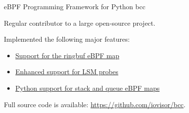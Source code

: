

\begin{cventries}

  \cventry
    {eBPF Programming Framework for Python} %
    {bcc} %
    {} %
    {} %
    {
      \begin{cvitems} %
        \item Regular contributor to a large open-source project.
        \item Implemented the following major features:
        \begin{itemize}
          \item \href{https://github.com/iovisor/bcc/commit/fe730f29f14bef8b5ffe1112c578df876c44d22d}
            {Support for the ringbuf eBPF map}
          \item \href{https://github.com/iovisor/bcc/commit/9b82af3ef53bbae76d9f09f403b58975995aa900}
            {Enhanced support for LSM probes}
          \item \href{https://github.com/iovisor/bcc/commit/e70bbdcbcbcd01e5570ba7b9d79e282d16a53d40}
            {Python support for stack and queue eBPF maps}
        \end{itemize}
        \item Full source code is available: \url{https://github.com/iovisor/bcc}.
      \end{cvitems}
    }

\end{cventries}

